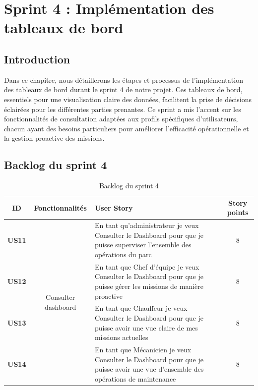 
\chapter{Sprint 4 : Implémentation des tableaux de bord }

\section*{Introduction}

Dans ce chapitre, nous détaillerons les étapes et processus de l'implémentation des tableaux de bord durant le sprint 4 de notre projet. Ces tableaux de bord, essentiels pour une visualisation claire des données, facilitent la prise de décisions éclairées pour les différentes parties prenantes. Ce sprint a mis l'accent sur les fonctionnalités de consultation adaptées aux profils spécifiques d'utilisateurs, chacun ayant des besoins particuliers pour améliorer l'efficacité opérationnelle et la gestion proactive des missions.


\section{Backlog du sprint 4}
\begin{table}[H]
    \centering
    \renewcommand{\arraystretch}{1.1}
    \begin{tabular}{|c|c|p{8cm}|c|}
        \hline
        \textbf{ID}   & \textbf{Fonctionnalités}             & \centering \textbf{User Story}                                                                                                  & \textbf{Story points} \\
        \hline
        \textbf{US11} & \multirow{4}{*}{Consulter dashboard} & En tant qu’administrateur je veux Consulter le Dashboard pour que je puisse superviser l'ensemble des opérations du parc        & 8                     \\
        \cline{1-1} \cline{3-4}
        \textbf{US12} &                                      & En tant que Chef d'équipe je veux Consulter le Dashboard pour que je puisse gérer les missions de manière proactive             & 8                     \\
        \cline{1-1} \cline{3-4}
        \textbf{US13} &                                      & En tant que Chauffeur je veux Consulter le Dashboard pour que je puisse avoir une vue claire de mes missions actuelles          & 8                     \\
        \cline{1-1} \cline{3-4}
        \textbf{US14} &                                      & En tant que Mécanicien je veux Consulter le Dashboard pour que je puisse avoir une vue d'ensemble des opérations de maintenance & 8                     \\
        \hline
    \end{tabular}
    \caption{Backlog du sprint 4}
\end{table}

